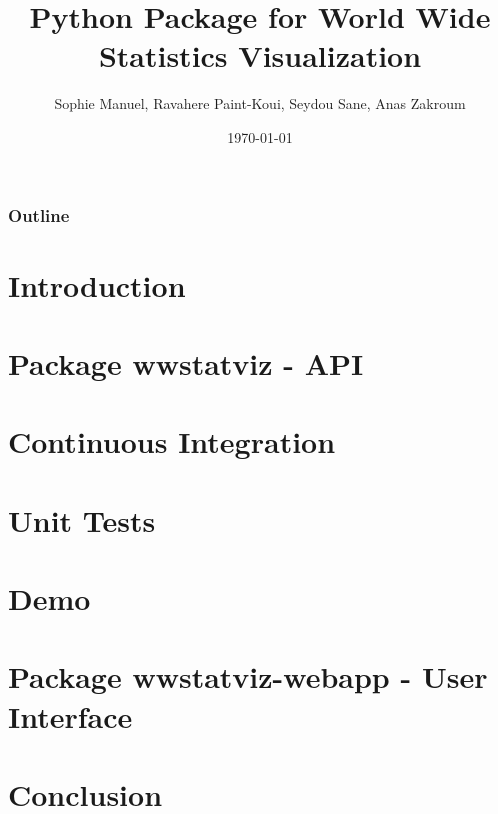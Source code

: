 \documentclass{beamer}
\title{Python Package for World Wide Statistics Visualization}
\subtitle{}
\author{\footnotesize{Sophie Manuel, Ravahere Paint-Koui, Seydou Sane, Anas Zakroum}}
\date{\today}
\institute{Université de Montpellier}
\begin{document}
\begin{frame}[plain]
  \titlepage
\end{frame}

\small
\begin{frame}[plain]
  \frametitle{Outline}
  \tableofcontents
\end{frame}
\normalsize

\section{Introduction}


\section{Package wwstatviz - API}


\section{Continuous Integration}


\section{Unit Tests}


\section{Demo}


\section{Package wwstatviz-webapp - User Interface}


\section{Conclusion}

\end{document}
